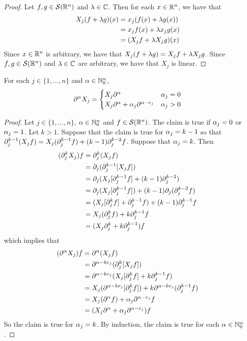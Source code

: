 \documentclass{book}
\begin{document}
	\begin{proof}
		Let $f, g \in \mathcal{S}(\mathbb{R}^n)$ and $\lambda \in \mathbb{C}$. Then for each $x \in \mathbb{R}^n$, we have that
		\begin{align*}
			X_j(f + \lambda g)(x) 
			& = x_j(f(x) + \lambda g(x)) \\
			& = x_jf(x) + \lambda x_j g(x) \\
			& = (X_jf + \lambda X_jg)(x)
		\end{align*} 
		Since $x \in \mathbb{R}^n$ is arbitrary, we have that $X_j(f + \lambda g) = X_jf + \lambda X_jg$. Since $f, g \in \mathcal{S}(\mathbb{R}^n)$ and $\lambda \in \mathbb{C}$ are arbitrary, we have that $X_j$ is linear.
	\end{proof}

	\begin{ex} 
		For each $j \in \{1, \ldots, n\}$ and $\alpha \in \mathbb{N}_0^n$, 
		\[
		\partial^{\alpha}X_j = 
		\begin{cases}
			X_j \partial^{\alpha} & \alpha_j = 0 \\
			X_j \partial^{\alpha}  + \alpha_j \partial^{\alpha - e_j}  & \alpha_j > 0 \\
		\end{cases}
		\]
	\end{ex}
	
	\begin{proof}
		Let $j \in \{1, \ldots, n\}$, $\alpha \in \mathbb{N}_0^n$ and $f \in \mathcal{S}(\mathbb{R}^n)$. The claim is true if $\alpha_j = 0$ or $\alpha _j = 1$.  Let $k > 1$. Suppose that the claim is true for $\alpha_j = k - 1$ so that $\partial_j^{k-1}(X_jf)= X_j(\partial_j^{k-1}f) + (k - 1) \partial_j^{k-2} f$. Suppose that $\alpha_j = k$. Then 
		\begin{align*}
			(\partial_j^k X_j) f
			& = \partial_j^k (X_j f) \\
			&= \partial_j (\partial_j^{k-1} [X_jf]) \\
			&= \partial_j (X_j[\partial_j^{k-1}f] + (k - 1) \partial_j^{k-2}) \\
			&= \partial_j (X_j[\partial_j^{k-1}f]) + (k - 1) \partial_j( \partial_j^{k-2} f) \\
			&= (X_j [\partial_j^{k}f] + \partial_j^{k-1}f)  + (k -1) \partial_j^{k-1}f \\
			&= X_j (\partial_j^{k}f) + k \partial_j^{k-1}f \\
			& = (X_j \partial_j^{k} + k \partial_j^{k-1}) f
		\end{align*}
		which implies that  
		\begin{align*}
			(\partial^{\alpha} X_j) f
			& = \partial^{\alpha}(X_j f) \\ 
			& = \partial^{\alpha - k e_j} (\partial_j^{k} [X_j f]) \\
			& = \partial^{\alpha - k e_j} (X_j [\partial_j^{k}f] + k \partial_j^{k-1}f) \\
			& = X_j (\partial^{\alpha - k e_j}[\partial_j^k f]) +  k \partial^{\alpha - k e_j} (\partial_j^{k-1}f) \\
			& = X_j(\partial^{\alpha} f) + \alpha_j \partial^{\alpha - e_j} f \\
			& = (X_j \partial^{\alpha}  + \alpha_j \partial^{\alpha - e_j} )f
		\end{align*}
		So the claim is true for $\alpha_j = k$. By induction, the claim is true for each $\alpha \in \mathbb{N}_0^n$. 
	\end{proof}
	
\end{document}

